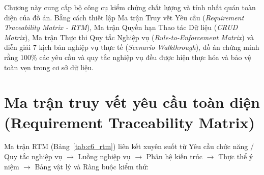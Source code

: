 
Chương này cung cấp bộ công cụ kiểm chứng chất lượng và tính nhất quán toàn diện của đồ án. Bằng cách thiết lập Ma trận Truy vết Yêu cầu (\textit{Requirement Traceability Matrix - RTM}), Ma trận Quyền hạn Thao tác Dữ liệu (\textit{CRUD Matrix}), Ma trận Thực thi Quy tắc Nghiệp vụ (\textit{Rule-to-Enforcement Matrix}) và diễn giải 7 kịch bản nghiệp vụ thực tế (\textit{Scenario Walkthrough}), đồ án chứng minh rằng 100\% các yêu cầu và quy tắc nghiệp vụ đều được hiện thực hóa và bảo vệ toàn vẹn trong cơ sở dữ liệu.

\section{Ma trận truy vết yêu cầu toàn diện (Requirement Traceability Matrix)}
\label{s:c6_rtm}

Ma trận RTM (Bảng~\ref{tab:c6_rtm}) liên kết xuyên suốt từ Yêu cầu chức năng / Quy tắc nghiệp vụ $\rightarrow$ Luồng nghiệp vụ $\rightarrow$ Phân hệ kiến trúc $\rightarrow$ Thực thể ý niệm $\rightarrow$ Bảng vật lý và Ràng buộc kiểm thử:


